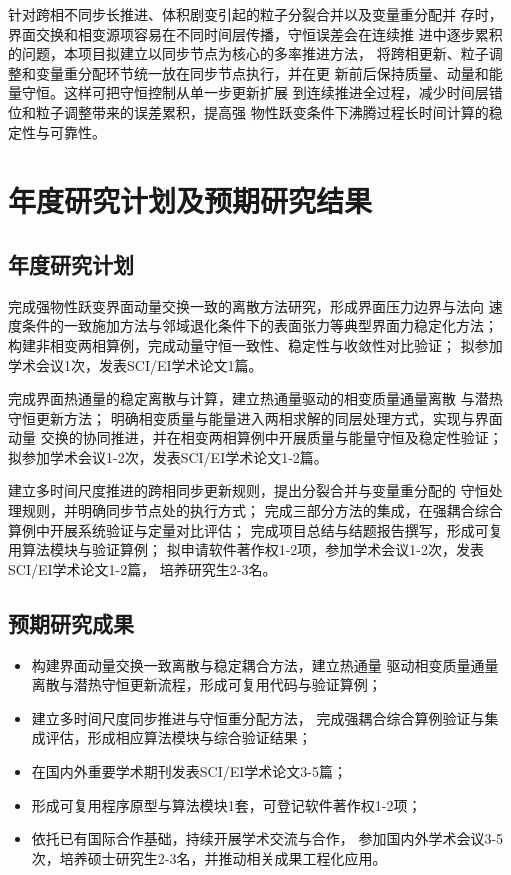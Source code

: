 针对跨相不同步长推进、体积剧变引起的粒子分裂合并以及变量重分配并
存时，界面交换和相变源项容易在不同时间层传播，守恒误差会在连续推
进中逐步累积的问题，本项目拟建立以同步节点为核心的多率推进方法，
将跨相更新、粒子调整和变量重分配环节统一放在同步节点执行，并在更
新前后保持质量、动量和能量守恒。这样可把守恒控制从单一步更新扩展
到连续推进全过程，减少时间层错位和粒子调整带来的误差累积，提高强
物性跃变条件下沸腾过程长时间计算的稳定性与可靠性。
%
\section{年度研究计划及预期研究结果}
\subsection{年度研究计划}


完成强物性跃变界面动量交换一致的离散方法研究，形成界面压力边界与法向
速度条件的一致施加方法与邻域退化条件下的表面张力等典型界面力稳定化方法；
构建非相变两相算例，完成动量守恒一致性、稳定性与收敛性对比验证；
拟参加学术会议1次，发表SCI/EI学术论文1篇。


完成界面热通量的稳定离散与计算，建立热通量驱动的相变质量通量离散
与潜热守恒更新方法；
明确相变质量与能量进入两相求解的同层处理方式，实现与界面动量
交换的协同推进，并在相变两相算例中开展质量与能量守恒及稳定性验证；
拟参加学术会议1-2次，发表SCI/EI学术论文1-2篇。


建立多时间尺度推进的跨相同步更新规则，提出分裂合并与变量重分配的
守恒处理规则，并明确同步节点处的执行方式；
完成三部分方法的集成，在强耦合综合算例中开展系统验证与定量对比评估；
完成项目总结与结题报告撰写，形成可复用算法模块与验证算例；
拟申请软件著作权1-2项，参加学术会议1-2次，发表SCI/EI学术论文1-2篇，
培养研究生2-3名。

%
\subsection{预期研究成果}

\begin{itemize}[left= 25pt]
	\item[$\bullet$] 构建界面动量交换一致离散与稳定耦合方法，建立热通量
	驱动相变质量通量离散与潜热守恒更新流程，形成可复用代码与验证算例；
	\item[$\bullet$] 建立多时间尺度同步推进与守恒重分配方法，
	完成强耦合综合算例验证与集成评估，形成相应算法模块与综合验证结果；
	\item[$\bullet$] 在国内外重要学术期刊发表SCI/EI学术论文3-5篇；
	\item[$\bullet$] 形成可复用程序原型与算法模块1套，可登记软件著作权1-2项；
    \item[$\bullet$] 依托已有国际合作基础，持续开展学术交流与合作，
    参加国内外学术会议3-5次，培养硕士研究生2-3名，并推动相关成果工程化应用。
\end{itemize}
\newpage

